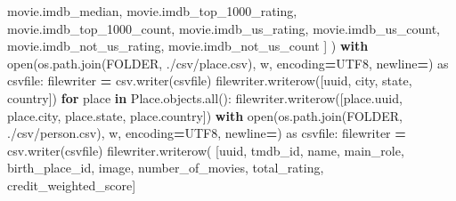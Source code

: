\documentclass[
]{article}
\newenvironment{Shaded}{\begin{snugshade}}{\end{snugshade}}
\newcommand{\BuiltInTok}[1]{#1}
\newcommand{\ControlFlowTok}[1]{\textcolor[rgb]{0.13,0.29,0.53}{\textbf{#1}}}
\newcommand{\ImportTok}[1]{#1}
\newcommand{\KeywordTok}[1]{\textcolor[rgb]{0.13,0.29,0.53}{\textbf{#1}}}
\newcommand{\NormalTok}[1]{#1}
\newcommand{\OperatorTok}[1]{\textcolor[rgb]{0.81,0.36,0.00}{\textbf{#1}}}
\newcommand{\StringTok}[1]{\textcolor[rgb]{0.31,0.60,0.02}{#1}}
\begin{document}
\begin{Shaded}
\begin{Highlighting}[]
\NormalTok{                     movie.imdb\_median, movie.imdb\_top\_1000\_rating, movie.imdb\_top\_1000\_count, movie.imdb\_us\_rating,}
\NormalTok{                     movie.imdb\_us\_count, movie.imdb\_not\_us\_rating, movie.imdb\_not\_us\_count}
\NormalTok{                     ]}
\NormalTok{                )}
        \ControlFlowTok{with} \BuiltInTok{open}\NormalTok{(os.path.join(FOLDER, }\StringTok{\textquotesingle{}./csv/place.csv\textquotesingle{}}\NormalTok{), }\StringTok{\textquotesingle{}w\textquotesingle{}}\NormalTok{,}
\NormalTok{                  encoding}\OperatorTok{=}\StringTok{\textquotesingle{}UTF8\textquotesingle{}}\NormalTok{, newline}\OperatorTok{=}\StringTok{\textquotesingle{}\textquotesingle{}}\NormalTok{) }\ImportTok{as}\NormalTok{ csvfile:}
\NormalTok{            filewriter }\OperatorTok{=}\NormalTok{ csv.writer(csvfile)}
\NormalTok{            filewriter.writerow([}\StringTok{\textquotesingle{}uuid\textquotesingle{}}\NormalTok{, }\StringTok{\textquotesingle{}city\textquotesingle{}}\NormalTok{, }\StringTok{\textquotesingle{}state\textquotesingle{}}\NormalTok{, }\StringTok{\textquotesingle{}country\textquotesingle{}}\NormalTok{])}
            \ControlFlowTok{for}\NormalTok{ place }\KeywordTok{in}\NormalTok{ Place.objects.}\BuiltInTok{all}\NormalTok{():}
\NormalTok{                filewriter.writerow([place.uuid, place.city, place.state, place.country])}
        \ControlFlowTok{with} \BuiltInTok{open}\NormalTok{(os.path.join(FOLDER, }\StringTok{\textquotesingle{}./csv/person.csv\textquotesingle{}}\NormalTok{), }\StringTok{\textquotesingle{}w\textquotesingle{}}\NormalTok{,}
\NormalTok{                  encoding}\OperatorTok{=}\StringTok{\textquotesingle{}UTF8\textquotesingle{}}\NormalTok{, newline}\OperatorTok{=}\StringTok{\textquotesingle{}\textquotesingle{}}\NormalTok{) }\ImportTok{as}\NormalTok{ csvfile:}
\NormalTok{            filewriter }\OperatorTok{=}\NormalTok{ csv.writer(csvfile)}
\NormalTok{            filewriter.writerow(}
\NormalTok{                [}\StringTok{\textquotesingle{}uuid\textquotesingle{}}\NormalTok{, }\StringTok{\textquotesingle{}tmdb\_id\textquotesingle{}}\NormalTok{, }\StringTok{\textquotesingle{}name\textquotesingle{}}\NormalTok{, }\StringTok{\textquotesingle{}main\_role\textquotesingle{}}\NormalTok{, }\StringTok{\textquotesingle{}birth\_place\_id\textquotesingle{}}\NormalTok{, }\StringTok{\textquotesingle{}image\textquotesingle{}}\NormalTok{, }\StringTok{\textquotesingle{}number\_of\_movies\textquotesingle{}}\NormalTok{, }\StringTok{\textquotesingle{}total\_rating\textquotesingle{}}\NormalTok{,}
                 \StringTok{\textquotesingle{}credit\_weighted\_score\textquotesingle{}}\NormalTok{]}

\end{Highlighting}
\end{Shaded}
\end{document}
